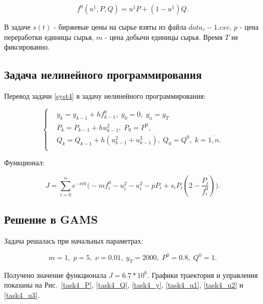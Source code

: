 \documentclass[14pt]{article}
\begin{document}
$$
    f^0(u^1,P,Q) = u^1 P + (1 -u^1) Q.
$$

В задаче $s(t)$ - биржевые цены на сырье взяты из файла $data_r-1.csv$, $p$ - цена переработки единицы сырья, $m$ - цена добычи единицы сырья. Время $T$ не фиксированно.

\subsection{Задача нелинейного программирования}

Перевод задачи \eqref{syst4} в задачу нелинейного программирования:

\begin{equation}\label{NLP4}
\left\{ \begin{aligned}
& y_{k} = y_{k-1} + h f^0_{k-1}, \; y_0 = 0,\; y_n = y_T \\
& P_{k} = P_{k-1} + h u^2_{k-1}, \; P_0 = P^0, \\
& Q_{k} = Q_{k-1} + h (u^2_{k-1} + u^3_{k-1}), \; Q_0 = Q^0, \; k = \overline{1,n}. \\
\end{aligned}\right.
\end{equation}

Функционал:

$$
    J = \sum_{i=0}^n e^{-\nu ih}\Big( -m f^0_i - u^2_i - u^3_i -p P_i + s_i P_i (2-\frac{P_i}{f^0_i}) \Big).
$$


\subsection{Решение в GAMS}

Задача решалась при начальных параметрах:

$$
    m = 1,\;p=5,\;\nu=0.01,\;y_T=2000,\;P^0=0.8,\;Q^0=1.
$$

Получено значение функционала $J = 6.7*10^6$. Графики траектория и управления показаны на Рис.~\ref{task4_P}, \ref{task4_Q}, \ref{task4_y}, \ref{task4_u1}, \ref{task4_u2} и \ref{task4_u3}.
\end{document}
